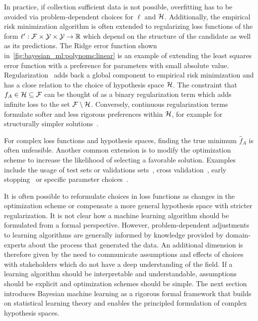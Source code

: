 In practice, if collection sufficient data is not possible, overfitting has to be avoided via problem-dependent choices for $\ell$ and $\mathcal{H}$.
Additionally, the empirical risk minimization algorithm is often extended to regularizing loss functions of the form $\ell^\prime : \mathcal{F} \times \mathcal{Y} \times \mathcal{Y} \to \mathbb{R}$ which depend on the structure of the candidate as well as its predictions.
The Ridge error function shown in~\cref{fig:bayesian_ml:polynoms:linear} is an example of extending the least squares error function with a preference for parameters with small absolute value.
Regularization~\parencite{oates_modern_2019} adds back a global component to empirical risk minimization and has a close relation to the choice of hypothesis space $\mathcal{H}$.
The constraint that $f_A \in \mathcal{H} \subseteq \mathcal{F}$ can be thought of as a binary regularization term which adds infinite loss to the set $\mathcal{F} \setminus \mathcal{H}$.
Conversely, continuous regularization terms formulate softer and less rigorous preferences within $\mathcal{H}$, for example for structurally simpler solutions~\parencite{bishop_christoph_pattern_2007,thorburn_occams_1915}.

For complex loss functions and hypothesis spaces, finding the true minimum $\hat{f}_A$ is often unfeasible.
Another common extension is to modify the optimization scheme to increase the likelihood of selecting a favorable solution.
Examples include the usage of test sets or validations sets~\parencite{bishop_christoph_pattern_2007}, cross validation~\parencite{stone_cross-validatory_1974}, early stopping~\parencite{morgan_generalization_1990} or specific parameter choices~\parencite{daniely_toward_2016}.

It is often possible to reformulate choices in loss functions as changes in the optimization scheme or compensate a more general hypothesis space with stricter regularization.
It is not clear how a machine learning algorithm should be formulated from a formal perspective.
However, problem-dependent adjustments to learning algorithms are generally informed by knowledge provided by domain-experts about the process that generated the data.
An additional dimension is therefore given by the need to communicate assumptions and effects of choices with stakeholders which do not have a deep understanding of the field.
If a learning algorithm should be interpretable and understandable, assumptions should be explicit and optimization schemes should be simple.
The next section introduces Bayesian machine learning as a rigorous formal framework that builds on statistical learning theory and enables the principled formulation of complex hypothesis spaces.

